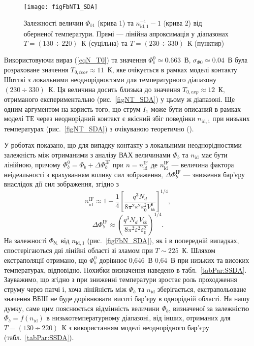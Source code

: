 \begin{figure}
\center
\texttt{[image: figFbNT1\_SDA]}
\caption{\label{figFbNT1_SDA}
Залежності величин $\Phi_{b1}$ (крива 1) та $n_{\mathrm{id},1}^{-1}-1$ (крива 2) від оберненої температури.
Прямі --- лінійна апроксимація у діапазонах $T=(130\div220)$~К (суцільна) та $T=(230\div330)$~К (пунктир)
}%
\end{figure}

Використовуючи вираз (\ref{eqN_T0}) та значення $\Phi_{b}^0\simeq0.663$~В, $\sigma_{\Phi0}\simeq0.04$~В
була розраховане значення $T_{0,teor}\approx11$~К, яке очікується в рамках моделі контакту Шотткі з локальними неоднорідностями
для температурного діапазону $(230\div330)$~К.
Ця величина досить близька до значення $T_{0,exp}\approx12$~К, отриманого експериментально (рис.~\ref{figNT_SDA}) у цьому ж діапазоні.
Ще одним аргументом на користь того, що струм $I_1$ може бути описаний в рамках моделі ТЕ через неоднорідний контакт є якісний збіг
поведінки $n_{\mathrm{id},1}$ при низьких температурах (рис.~\ref{figNT_SDA}) з очікуваною теоретично (\cite[Fig.11(b)]{Tung:PhysRev}).


У роботах  \cite{Tung:PhysRev,Sarpatwari,Schmitsdorf} показано, що для випадку
контакту з локальними неоднорідностями залежність між отриманими з аналізу ВАХ величинами $\Phi_b$ та $n_\mathrm{id}$ має бути лінійною,
причому $\Phi_{b}^0=\Phi_{b}+\Delta\Phi_b^\mathrm{IF}$ при $n=n_\mathrm{id}^\mathrm{IF}$
де $n_\mathrm{id}^\mathrm{IF}$ ---  величина фактора неідеальності з врахуванням впливу сил зображення,
$\Delta\Phi_b^\mathrm{IF}$ --- зниження бар'єру внаслідок дії сил зображення,
згідно з \cite{Sarpatwari}
\begin{equation}\label{eqN:IF}
n_\mathrm{id}^\mathrm{IF}\approx 1+\frac14\left[\frac{q^3N_d}{8\pi^2\varepsilon^2\varepsilon_0^2V^3_{bb}}\right]^{1/4},
\end{equation}
\begin{equation}\label{eqFb:IF}
\Delta\Phi_b^\mathrm{IF}\approx \left(\frac{q^3N_d\,V_{bb}}{8\pi^2\varepsilon^2\varepsilon_0^2}\right)^{1/4}.
\end{equation}
На залежності $\Phi_{b1}$ від $n_{\mathrm{id},1}$ (рис.~\ref{figFbN_SDA}), як і в попередній випадках,
спостерігаються дві лінійні області зі зламом при $T\sim225$~К.
Шляхом екстраполяції отримано, що $\Phi_b^0$ дорівнює 0,646~В 0,64~В при низьких та високих температурах, відповідно.
Похибки визначення наведено в табл.~\ref{tabPar:SSDA}.
Зауважимо, що згідно з \cite{Sarpatwari,Schmitsdorf}
при зниженні температури зростає роль проходження струму через патчі і, хоча лінійність між  $\Phi_b$ та $n_\mathrm{id}$ зберігається,
екстрапольоване значення ВБШ не буде дорівнювати висоті бар'єру в однорідній області.
На нашу думку, саме цим пояснюється відмінність величини $\Phi_b$, визначеної за залежністю
$\Phi_b=f(n_\mathrm{id})$ в низькотемпературному діапазоні, від інших,
отриманих для $T=(130\div220)$~К з використанням моделі неоднорідного бар'єру (табл.~\ref{tabPar:SSDA}).

